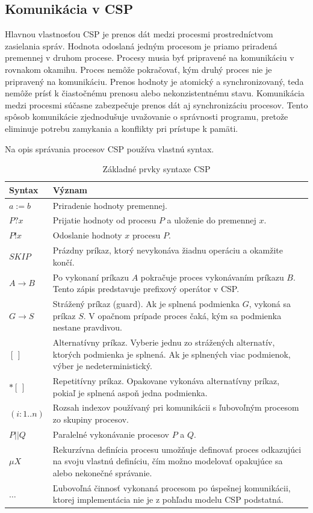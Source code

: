 \documentclass[
  biblatex,
  seconds=true,
  language=slovak,
  figures=false,
  urldate=iso,
  glossaries,
  index
]{kidiplom}
\begin{document}
\subsection{Komunikácia v CSP}
 Hlavnou vlastnosťou CSP je prenos dát medzi procesmi prostredníctvom zasielania správ. Hodnota odoslaná jedným procesom je priamo priradená premennej v druhom
procese. Procesy musia byť pripravené na komunikáciu v rovnakom okamihu.
Proces nemôže pokračovať, kým druhý proces nie je pripravený na komunikáciu.
Prenos hodnoty je atomický a synchronizovaný, teda nemôže prísť k čiastočnému prenosu alebo nekonzistentnému stavu.
Komunikácia medzi procesmi súčasne zabezpečuje prenos dát aj synchronizáciu procesov.
Tento spôsob komunikácie zjednodušuje uvažovanie o správnosti programu, pretože eliminuje potrebu zamykania a konflikty pri prístupe k pamäti.

Na opis správania procesov CSP používa vlastnú syntax.

\begin{table}[H]
\centering
\caption{Základné prvky syntaxe CSP \cite{hoare1978s}}
\begin{tabular}{|l|p{10cm}|}
\hline
\textbf{Syntax} & \textbf{Význam} \\ \hline
$a := b$ & Priradenie hodnoty premennej. \\ \hline
$P?x$ & Prijatie hodnoty od procesu $P$ a uloženie do premennej $x$. \\ \hline
$P!x$ & Odoslanie hodnoty $x$ procesu $P$. \\ \hline
$SKIP$ & Prázdny príkaz, ktorý nevykonáva žiadnu operáciu a okamžite končí. \\ \hline
$A \rightarrow B$ & Po vykonaní príkazu $A$ pokračuje proces vykonávaním príkazu $B$. Tento zápis predstavuje prefixový operátor v CSP. \\ \hline
$G \rightarrow S$ & Strážený príkaz (guard). Ak je splnená podmienka $G$, vykoná sa príkaz $S$. V opačnom prípade proces čaká, kým sa podmienka nestane pravdivou. \\ \hline
$[\,]$ & Alternatívny príkaz. Vyberie jednu zo strážených alternatív, ktorých podmienka je splnená. Ak je splnených viac podmienok, výber je nedeterministický. \\ \hline
$*[\,]$ & Repetitívny príkaz. Opakovane vykonáva alternatívny príkaz, pokiaľ je splnená aspoň jedna podmienka. \\ \hline
$(i:1..n)$ & Rozsah indexov používaný pri komunikácii s ľubovoľným procesom zo skupiny procesov. \\ \hline
$P || Q$ & Paralelné vykonávanie procesov $P$ a $Q$. \\ \hline
$\mu X$ & Rekurzívna definícia procesu umožňuje definovať proces odkazujúci na svoju vlastnú definíciu, čím možno modelovať opakujúce sa alebo nekonečné správanie. \\ \hline
$\dots$ & Ľubovoľná činnosť vykonaná procesom po úspešnej komunikácii, ktorej implementácia nie je z pohľadu modelu CSP podstatná. \\
\hline
\end{tabular}
\end{table}
\end{document}
